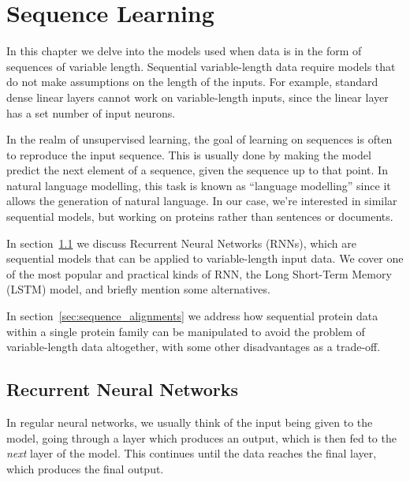 \chapter{Sequence Learning}
\label{chapter:sequence_learning}
In this chapter we delve into the models used when data is in the form of sequences of variable length. Sequential variable-length data require models that do not make assumptions on the length of the inputs. For example, standard dense linear layers cannot work on variable-length inputs, since the linear layer has a set number of input neurons.

In the realm of unsupervised learning, the goal of learning on sequences is often to reproduce the input sequence. This is usually done by making the model predict the next element of a sequence, given the sequence up to that point. In natural language modelling, this task is known as ``language modelling'' since it allows the generation of natural language. In our case, we're interested in similar sequential models, but working on proteins rather than sentences or documents.

In section~\ref{sec:recurrent_neural_networks} we discuss Recurrent Neural Networks (RNNs), which are sequential models that can be applied to variable-length input data. We cover one of the most popular and practical kinds of RNN, the Long Short-Term Memory (LSTM) model, and briefly mention some alternatives.

In section~\ref{sec:sequence_alignments} we address how sequential protein data  within a single protein family can be manipulated to avoid the problem of variable-length data altogether, with some other disadvantages as a trade-off.

\section{Recurrent Neural Networks}
\label{sec:recurrent_neural_networks}
In regular neural networks, we usually think of the input being given to the model, going through a layer which produces an output, which is then fed to the \textit{next} layer of the model. This continues until the data reaches the final layer, which produces the final output.

